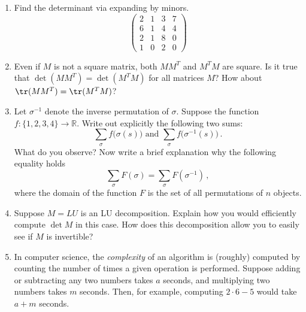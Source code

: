 


\begin{enumerate}

\item Find the determinant via expanding by minors.
\[
\begin{pmatrix}
2 & 1&3&7 \\
6& 1&4&4 \\
2 & 1&8&0 \\
1 & 0&2&0 
\end{pmatrix}
\]


\item Even if $M$ is not a square matrix, both $MM^{T}$ and $M^{T}M$ are square. Is it true that $\det (MM^T) =\det (M^T M) $ for all matrices $M$? How about $\tr(MM^T)= \tr (M^TM)$? 


%
%
%

\item \label{invsum} Let $\sigma^{-1}$ denote the inverse permutation of $\sigma$. Suppose the function $f:\{1,2,3,4\}\to {\mathbb R}$. Write out explicitly the following two sums:
\[
\sum_\sigma f\big(\sigma(s)\big)\mbox{ and } \sum_\sigma f\big(\sigma^{-1}(s)\big)\, .
\]
What do you observe? Now write a brief explanation why the following equality holds
\[
\sum_\sigma F(\sigma) =\sum_\sigma F(\sigma^{-1})\, ,
\]
where the domain of the function $F$ is the set of all permutations of $n$ objects.


\item Suppose $M=LU$ is an LU decomposition.  Explain how you would efficiently compute $\det M$ in this case. How does this decomposition allow you to easily see if $M$ is invertible? 



\item \label{problem_complexity} In computer science, the \emph{complexity} of an algorithm is (roughly) computed by counting the number of times a given operation is performed.  Suppose adding or subtracting any two numbers takes $a$ seconds, and multiplying two numbers takes $m$ seconds.  Then, for example, computing $2\cdot6-5$ would take $a+m$ seconds.




\end{enumerate}
